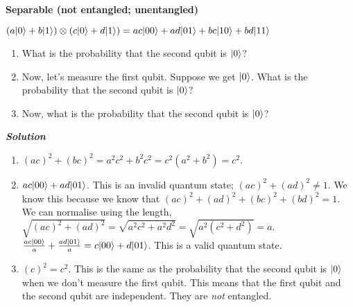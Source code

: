 \pagebreak

\begin{example}
    \textbf{Separable (not entangled; unentangled)}

    $(a\lvert0\rangle + b\lvert1\rangle) \otimes (c\lvert0\rangle + d\lvert1\rangle) = ac\lvert0 0\rangle + ad\lvert0 1\rangle + bc\lvert1 0\rangle + bd\lvert1 1\rangle$
    \begin{enumerate}
        \item What is the probability that the second qubit is $\lvert0\rangle$?
        \item Now, let's measure the first qubit. Suppose we get $\lvert0\rangle$. What is the probability that the second qubit is $\lvert0\rangle$?
        \item Now, what is the probability that the second qubit is $\lvert0\rangle$?
    \end{enumerate}
    \textbf{\emph{Solution}}
    \begin{enumerate}
        \item $(ac)^2 + (bc)^2 = a^2 c^2 + b^2 c^2 = c^2(a^2 + b^2) = c^2$.
        \item  $ac\lvert00\rangle + ad\lvert01\rangle$. This is an invalid quantum state; $(ac)^2 + (ad)^2 \neq 1$. We know this because we know that $(ac)^2 + (ad)^2 + (bc)^2 + (bd)^2 = 1$. We can normalise using the length, $\sqrt{(ac)^2 + (ad)^2} = \sqrt{a^2 c^2 + a^2 d^2} = \sqrt{a^2(c^2 + d^2)} = a$. $\frac{ac\lvert00\rangle}{a} + \frac{ad\lvert01\rangle}{a} = c\lvert00\rangle + d\lvert01\rangle$. This is a valid quantum state.
        \item $(c)^2 = c^2$. This is the same as the probability that the second qubit is $\lvert0\rangle$ when we don't measure the first qubit. This means that the first qubit and the second qubit are independent. They are \emph{not} entangled.
    \end{enumerate}
\end{example}

